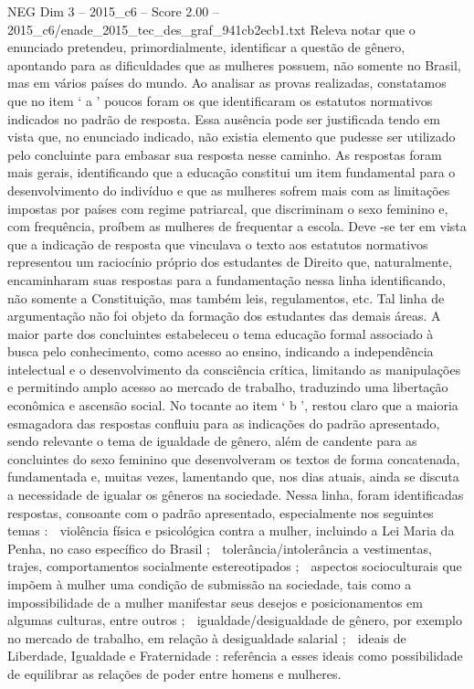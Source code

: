 \begin{textsample}{NEG Dim 3 – 2015\_c6 – Score 2.00 – 2015\_c6/enade\_2015\_tec\_des\_graf\_941cb2ecb1.txt}
Releva notar que o enunciado pretendeu, primordialmente, identificar a questão de gênero, apontando para as dificuldades que as mulheres possuem, não somente no Brasil, mas em vários países do mundo.
Ao analisar as provas realizadas, constatamos que no item ‘ a ’ poucos foram os que identificaram os estatutos normativos indicados no padrão de resposta.
Essa ausência pode ser justificada tendo em vista que, no enunciado indicado, não existia elemento que pudesse ser utilizado pelo concluinte para embasar sua resposta nesse caminho.
As respostas foram mais gerais, identificando que a educação constitui um item fundamental para o desenvolvimento do indivíduo e que as mulheres sofrem mais com as limitações impostas por países com regime patriarcal, que discriminam o sexo feminino e, com frequência, proíbem as mulheres de frequentar a escola.
Deve -se ter em vista que a indicação de resposta que vinculava o texto aos estatutos normativos representou um raciocínio próprio dos estudantes de Direito que, naturalmente, encaminharam suas respostas para a fundamentação nessa linha identificando, não somente a Constituição, mas também leis, regulamentos, etc.
Tal linha de argumentação não foi objeto da formação dos estudantes das demais áreas.
A maior parte dos concluintes estabeleceu o tema educação formal associado à busca pelo conhecimento, como acesso ao ensino, indicando a independência intelectual e o desenvolvimento da consciência crítica, limitando as manipulações e permitindo amplo acesso ao mercado de trabalho, traduzindo uma libertação econômica e ascensão social.
No tocante ao item ‘ b ’, restou claro que a maioria esmagadora das respostas confluiu para as indicações do padrão apresentado, sendo relevante o tema de igualdade de gênero, além de candente para as concluintes do sexo feminino que desenvolveram os textos de forma concatenada, fundamentada e, muitas vezes, lamentando que, nos dias atuais, ainda se discuta a necessidade de igualar os gêneros na sociedade.
Nessa linha, foram identificadas respostas, consoante com o padrão apresentado, especialmente nos seguintes temas :  violência física e psicológica contra a mulher, incluindo a Lei Maria da Penha, no caso específico do Brasil ;  tolerância/intolerância a vestimentas, trajes, comportamentos socialmente estereotipados ;  aspectos socioculturais que impõem à mulher uma condição de submissão na sociedade, tais como a impossibilidade de a mulher manifestar seus desejos e posicionamentos em algumas culturas, entre outros ;  igualdade/desigualdade de gênero, por exemplo no mercado de trabalho, em relação à desigualdade salarial ;  ideais de Liberdade, Igualdade e Fraternidade : referência a esses ideais como possibilidade de equilibrar as relações de poder entre homens e mulheres.

\end{textsample}
